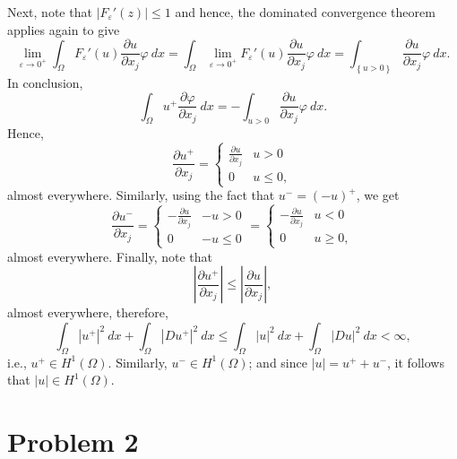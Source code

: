 \documentclass[10pt]{amsart}
\theoremstyle{thmstyle}
\theoremstyle{defstyle}
\renewcommand{\le}{\leqslant}
\renewcommand{\ge}{\geqslant}
\begin{document}
Next, note that $|F_\varepsilon'(z)|\le 1$ and hence, the dominated convergence theorem applies again to give 
\begin{equation*}
    \lim_{\varepsilon\to 0^+}\int_{\Omega} F_\varepsilon'(u)\frac{\partial u}{\partial x_j}\varphi~dx = \int_{\Omega}\lim_{\varepsilon\to 0^+} F_\varepsilon'(u)\frac{\partial u}{\partial x_j}\varphi~dx = \int_{\left\{u > 0\right\}}\frac{\partial u}{\partial x_j}\varphi~dx.
\end{equation*}
In conclusion, 
\begin{equation*}
    \int_\Omega u^+\frac{\partial\varphi}{\partial x_j}~dx = -\int_{u > 0}\frac{\partial u}{\partial x_j}\varphi~dx.
\end{equation*}
Hence, 
\begin{equation*}
    \frac{\partial u^+}{\partial x_j} = 
    \begin{cases}
        \frac{\partial u}{\partial x_j} & u > 0\\
        0 & u\le 0,
    \end{cases}
\end{equation*}
almost everywhere. Similarly, using the fact that $u^- = (-u)^+$, we get 
\begin{equation*}
    \frac{\partial u^-}{\partial x_j} = 
    \begin{cases}
        -\frac{\partial u}{\partial x_j} & -u > 0\\
        0 & -u\le 0
    \end{cases}
    =
    \begin{cases}
        -\frac{\partial u}{\partial x_j} & u < 0\\
        0 & u\ge 0,
    \end{cases}
\end{equation*}
almost everywhere. Finally, note that 
\begin{equation*}
    \left|\frac{\partial u^+}{\partial x_j}\right|\le\left|\frac{\partial u}{\partial x_j}\right|,
\end{equation*}
almost everywhere, therefore, 
\begin{equation*}
    \int_\Omega |u^+|^2~dx + \int_\Omega|Du^+|^2~dx\le\int_\Omega |u|^2~dx + \int_\Omega |Du|^2~dx < \infty,
\end{equation*}
i.e., $u^+\in H^1(\Omega)$. Similarly, $u^-\in H^1(\Omega)$; and since $|u| = u^+ + u^-$, it follows that $|u|\in H^1(\Omega)$.

\section{Problem 2}
\end{document}
